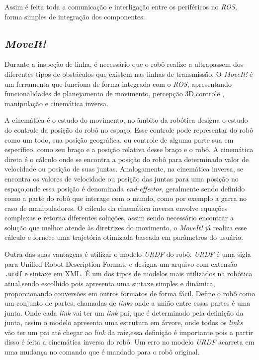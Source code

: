 Assim é feita toda a comunicação e interligação entre os periféricos no \textit{ROS}, forma simples de integração dos componentes.

\subsection{\textit{MoveIt!}}
Durante a inspeção de linha, é necessário que o robô realize a ultrapassem dos diferentes tipos de obstáculos que existem nas linhas de transmissão. O \textit{MoveIt!} é um ferramenta que funciona de forma integrada com o \textit{ROS}, apresentando funcionalidades de planejamento de movimento, percepção 3D,controle , manipulação e cinemática inversa. 

A cinemática é o estudo do movimento, no âmbito da robótica designa o estudo do controle da posição do robô no espaço. Esse controle pode representar do robô como um todo, sua posição geográfica, ou controle de alguma parte sua em específico, como seu braço e a posição relativa desse braço e o robô.  A cinemática direta é o cálculo onde se encontra a posição do robô para determinado valor de velocidade ou posição de suas juntas. Analogamente, na cinemática inversa, se encontra os valores de velocidade ou posição das juntas para uma posição no espaço,onde essa posição é denominada \textit{end-effector}, geralmente sendo definido como a parte do robô que interage com o mundo, como por exemplo a garra no caso de manipuladores. O cálculo da cinemática inversa envolve equações complexas e retorna diferentes soluções, assim sendo necessário encontrar a solução que melhor atende às diretrizes do movimento, o \textit{MoveIt!} já realiza esse cálculo e fornece uma trajetória otimizada baseada em parâmetros do usuário.

Outra das suas vantagens é utilizar o modelo \textit{URDF} do robô. \textit{URDF} é uma sigla para Unified Robot Description Format, e designa um arquivo com extensão \verb|.urdf| e sintaxe em XML. É um dos tipos de modelos mais utilizados na robótica atual,sendo escolhido pois apresenta uma sintaxe simples e dinâmica, proporcionando conversões em outros formatos de forma fácil. Define o robô como um conjunto de partes, chamadas de \textit{links} onde a união entre essas partes é uma junta. Onde cada \textit{link} vai ter um \textit{link} pai, que é determinado pela definição da junta, assim o modelo apresenta uma estrutura em árvore, onde todos os \textit{links} vão ter um pai até chegar ao \textit{link} da raíz,essa definição é importante pois a partir disso é feita a cinemática inversa do robô. Um erro no modelo \textit{URDF} acarreta em uma mudança no comando que é mandado para o robô original.

